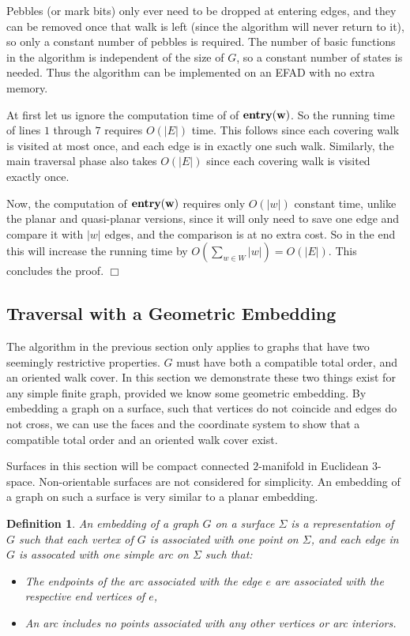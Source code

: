 \documentclass[11pt]{article}
\newcommand{\entry}{\bf entry}
\newtheorem{definition}[theorem]{Definition}
\begin{document}
Pebbles (or mark bits) only ever need to be dropped at entering edges, and they can be removed 
once that walk is left (since the algorithm will never return to it), so only a constant number 
of pebbles is required.  The number of basic functions in the algorithm is independent of the size 
of $G$, so a constant number of states is needed.  Thus the algorithm can be implemented on an EFAD 
with no extra memory.  

At first let us ignore the computation time of of $\entry(w)$.  
So the running time of lines $1$ through $7$ requires $O(|E|)$ time.  This follows since each covering walk 
is visited at most once, and each edge is in exactly one such walk.  Similarly, the 
main traversal phase also takes $O(|E|)$ since each covering walk is visited exactly once.  

Now, the computation of $\entry(w)$ requires only $O(|w|)$ constant time, unlike the planar 
and quasi-planar versions, since it will only need to save one edge and compare it with 
$|w|$ edges, and the comparison is at no extra cost.  So in the end this will increase the running time 
by $O(\sum_{w\in W}|w|) = O(|E|)$.  This concludes the proof.  $\Box$

\subsection{Traversal with a Geometric Embedding}%

The algorithm in the previous section only applies to graphs that have two seemingly restrictive properties.  
$G$ must have both a compatible total order, and an oriented walk cover.  
In this section we demonstrate these two things exist for any simple finite graph, provided 
we know some geometric embedding.  By embedding a graph on a surface, such that vertices do not 
coincide and edges do not cross, we can use the faces and the coordinate system to show that a compatible 
total order and an oriented walk cover exist.

Surfaces in this section will be compact connected $2$-manifold in Euclidean $3$-space.  Non-orientable 
surfaces are not considered for simplicity.  An embedding of a graph on such a surface is very similar 
to a planar embedding.

\begin{definition}
An \emph{embedding} of a graph $G$ on a surface $\Sigma$ is a 
representation of $G$ such that each vertex of $G$ is associated with one point on $\Sigma$, and 
each edge in $G$ is assocated with one simple arc on $\Sigma$ such that:
\begin{itemize}
\item The endpoints of the arc associated with the edge $e$ are associated with the respective end vertices of $e$,
\item An arc includes no points associated with any other vertices or arc interiors.
\end{itemize} 
\end{definition}
\end{document}
